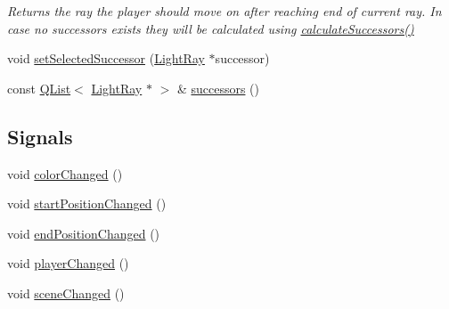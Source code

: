 \begin{DoxyCompactItemize}
\begin{DoxyCompactList}\small\item\em Returns the ray the player should move on after reaching end of current ray. In case no successors exists they will be calculated using \hyperlink{class_light_ray_a1711b1964da22ce4083740adc2233780}{calculate\+Successors()} \end{DoxyCompactList}\item 
void \hyperlink{class_light_ray_a2644a596af5de9b41f770131b5c2b0eb}{set\+Selected\+Successor} (\hyperlink{class_light_ray}{Light\+Ray} $\ast$successor)
\item 
const \hyperlink{singleton_q_list}{Q\+List}$<$ \hyperlink{class_light_ray}{Light\+Ray} $\ast$ $>$ \& \hyperlink{class_light_ray_a6673a77eb8fcd32dcfde26a1b112d303}{successors} ()
\end{DoxyCompactItemize}
\subsection*{Signals}
\begin{DoxyCompactItemize}
\item 
void \hyperlink{class_light_ray_a4c9bff5b766f6ba5f4a265cd6aa64958}{color\+Changed} ()
\item 
void \hyperlink{class_light_ray_a5be9eb60aae11d0c24e7db4aa1f89b6c}{start\+Position\+Changed} ()
\item 
void \hyperlink{class_light_ray_a146c3e8249de30de6340fffbf0c1a4d6}{end\+Position\+Changed} ()
\item 
void \hyperlink{class_light_ray_a7b14272e752393259f0b645d92113782}{player\+Changed} ()
\item 
void \hyperlink{class_light_ray_aeea833ba9fe0fe8a3810ba002c3dbec4}{scene\+Changed} ()
\end{DoxyCompactItemize}
